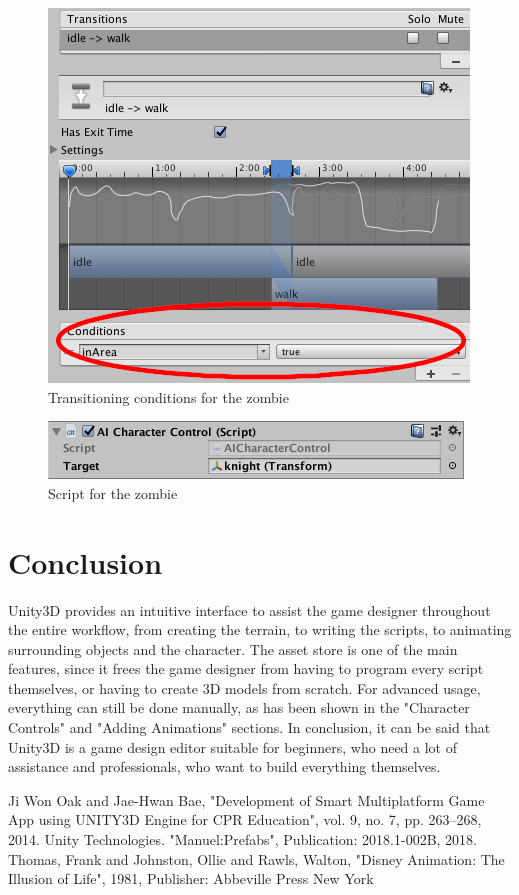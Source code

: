 \documentclass[conference]{IEEEtran}
\begin{document}
\begin{figure}[htbp]
  \includegraphics[width=.4\textwidth]{pictures/zombie_transition}
  \caption{Transitioning conditions for the zombie}
  \label{fig:adding_animations_zombie_transition}
\end{figure}

\begin{figure}[htbp]
  \includegraphics[width=.4\textwidth]{pictures/zombie_script}
  \caption{Script for the zombie}
  \label{fig:adding_animations_zombie_script}
\end{figure}

\section{Conclusion}

Unity3D provides an intuitive interface to assist the game designer throughout the entire workflow, from creating the terrain, to writing the scripts, to animating surrounding objects and the character. The asset store is one of the main features, since it frees the game designer from having to program every script themselves, or having to create 3D models from scratch. For advanced usage, everything can still be done manually, as has been shown in the "Character Controls" and "Adding Animations" sections. In conclusion, it can be said that Unity3D is a game design editor suitable for beginners, who need a lot of assistance and professionals, who want to build everything themselves.


\begin{thebibliography}{00}
 Ji Won Oak and Jae-Hwan Bae, "Development of Smart Multiplatform Game App using UNITY3D Engine for CPR Education", vol. 9, no. 7, pp. 263--268, 2014.
 Unity Technologies. "Manuel:Prefabs", Publication: 2018.1-002B, 2018.
 Thomas, Frank and Johnston, Ollie and Rawls, Walton, "Disney Animation: The Illusion of Life", 1981, Publisher: Abbeville Press New York
\end{thebibliography}
\end{document}
